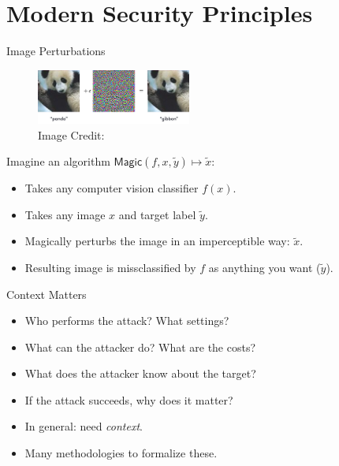 \documentclass[10pt]{beamer}
\begin{document}
\section{Modern Security Principles}


\begin{frame}{Image Perturbations}
  \begin{figure}
    \includegraphics[width=2in]{panda.png} \\
    \footnotesize Image Credit: \cite{GoodfellowSS14}
  \end{figure}

  Imagine an algorithm $\textsf{Magic}(f, x, \tilde y) \mapsto \tilde x$:
  \begin{itemize}[<+-| alert@+>]
    \item Takes any computer vision classifier $f(x)$.
    \item Takes any image $x$ and target label $\tilde y$.
    \item Magically perturbs the image in an imperceptible way: $\tilde x$.
    \item Resulting image is missclassified by $f$ as anything you want ($\tilde y$).
  \end{itemize}


\end{frame}

\begin{frame}{Context Matters}
    \begin{itemize}[<+-| alert@+>]
    \item Who performs the attack? What settings?
    \item What can the attacker do? What are the costs?
    \item What does the attacker know about the target?
    \item If the attack succeeds, why does it matter?
    \item In general: need \emph{context}.
    \item Many methodologies to formalize these.
  \end{itemize}
\end{frame}
\end{document}
